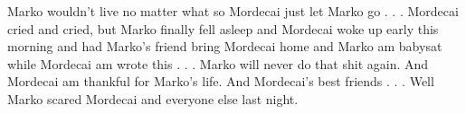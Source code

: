 \documentclass[12pt]{book}
\begin{document}
Marko wouldn't live no matter what so Mordecai just let Marko go . . .  Mordecai cried and cried, but Marko finally fell asleep and Mordecai woke up early this morning and had Marko's friend bring Mordecai home and Marko am babysat while Mordecai am wrote this . . .  Marko will never do that shit again. And Mordecai am thankful for Marko's life. And Mordecai's best friends . . .  Well Marko scared Mordecai and everyone else last night.
\end{document}
